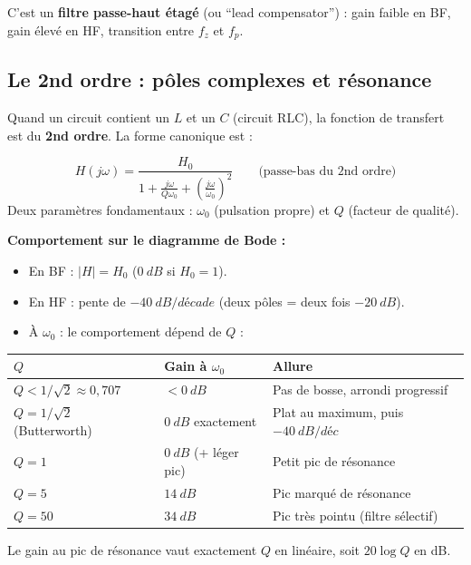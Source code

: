 \documentclass[12pt,a4paper,twoside]{book}
\begin{document}
C'est un \textbf{filtre passe-haut étagé} (ou ``lead compensator'') : gain faible en BF, gain élevé en HF, transition entre $f_z$ et $f_p$.

\subsection{Le 2nd ordre : pôles complexes et résonance}

Quand un circuit contient un $L$ et un $C$ (circuit RLC), la fonction de transfert est du \textbf{2nd ordre}. La forme canonique est :

\begin{formule}
\[
\boxed{H(j\omega) = \frac{H_0}{1 + \frac{j\omega}{Q\omega_0} + \left(\frac{j\omega}{\omega_0}\right)^2}} \qquad \text{(passe-bas du 2nd ordre)}
\]
Deux paramètres fondamentaux : $\omega_0$ (pulsation propre) et $Q$ (facteur de qualité).
\end{formule}

\textbf{Comportement sur le diagramme de Bode :}
\begin{itemize}[nosep]
\item En BF : $|H| = H_0$ ($\SI{0}{dB}$ si $H_0 = 1$).
\item En HF : pente de $-\SI{40}{dB/décade}$ (deux pôles = deux fois $-\SI{20}{dB}$).
\item À $\omega_0$ : le comportement dépend de $Q$ :
\end{itemize}

\begin{center}
\renewcommand{\arraystretch}{1.4}
\begin{tabular}{lll}
\toprule
\textbf{$Q$} & \textbf{Gain à $\omega_0$} & \textbf{Allure} \\
\midrule
$Q < 1/\sqrt{2} \approx 0{,}707$ & $< \SI{0}{dB}$ & Pas de bosse, arrondi progressif \\
$Q = 1/\sqrt{2}$ (Butterworth) & $\SI{0}{dB}$ exactement & Plat au maximum, puis $-\SI{40}{dB/déc}$ \\
$Q = 1$ & $\SI{0}{dB}$ (+ léger pic) & Petit pic de résonance \\
$Q = 5$ & $\SI{+14}{dB}$ & Pic marqué de résonance \\
$Q = 50$ & $\SI{+34}{dB}$ & Pic très pointu (filtre sélectif) \\
\bottomrule
\end{tabular}
\end{center}

Le gain au pic de résonance vaut exactement $Q$ en linéaire, soit $20\log Q$ en dB.
\end{document}

